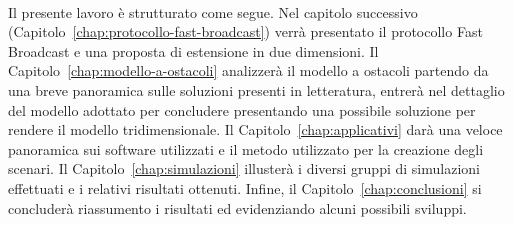 \paragraph{}
Il presente lavoro è strutturato come segue.
Nel capitolo successivo (Capitolo~\ref{chap:protocollo-fast-broadcast}) verrà presentato il protocollo Fast Broadcast e una proposta di estensione in due dimensioni.
Il Capitolo~\ref{chap:modello-a-ostacoli} analizzerà il modello a ostacoli partendo da una breve panoramica sulle soluzioni presenti in letteratura,
entrerà nel dettaglio del modello adottato per concludere presentando una possibile soluzione per rendere il modello tridimensionale.
Il Capitolo~\ref{chap:applicativi} darà una veloce panoramica sui software utilizzati e il metodo utilizzato per la creazione degli scenari.
Il Capitolo~\ref{chap:simulazioni} illusterà i diversi gruppi di simulazioni effettuati e i relativi risultati ottenuti.
Infine, il Capitolo~\ref{chap:conclusioni}
si concluderà riassumento i risultati ed evidenziando alcuni possibili sviluppi.
%
